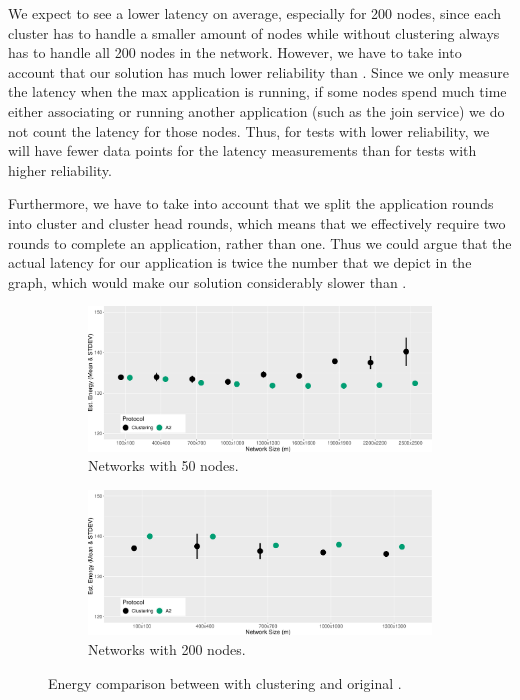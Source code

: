 We expect to see a lower latency on average, especially for 200 nodes, since each cluster has to handle a smaller amount of nodes while \atwo{} without clustering always has to handle all 200 nodes in the network. However, we have to take into account that our solution has much lower reliability than \atwo{}. Since we only measure the latency when the max application is running, if some nodes spend much time either associating or running another application (such as the join service) we do not count the latency for those nodes. Thus, for tests with lower reliability, we will have fewer data points for the latency measurements than for tests with higher reliability.

Furthermore, we have to take into account that we split the application rounds into cluster and cluster head rounds, which means that we effectively require two rounds to complete an application, rather than one. Thus we could argue that the actual latency for our application is twice the number that we depict in the graph, which would make our solution considerably slower than \atwo{}.

\begin{figure}[bt]
    \centering
    \begin{subfigure}{0.7\textwidth}
        \centering
        \includegraphics[width=\textwidth]{figure/Results/ChaosComparison/ChaosComparison_50_Energy.pdf}
        \caption{Networks with 50 nodes.}
        \label{subfig:energy-50-nodes}
    \end{subfigure}
    \hfill
    \begin{subfigure}{0.7\textwidth}
        \centering
        \includegraphics[width=\textwidth]{figure/Results/ChaosComparison/ChaosComparison_200_Energy.pdf}
        \caption{Networks with 200 nodes.}
        \label{subfig:energy-200-nodes}
    \end{subfigure}
    \caption{Energy comparison between \atwo{} with clustering and original \atwo{}.}
    \label{fig:energy-results}
\end{figure}


